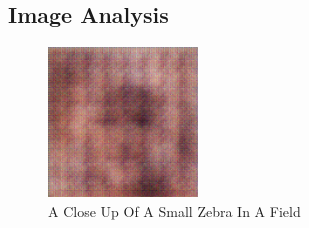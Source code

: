 \documentclass{article}%
\begin{document}
%
\subsection{Image Analysis}%
\label{subsec:ImageAnalysis}%


\begin{figure}[h!]%
\centering%
\includegraphics[width=150px]{500_fake_images/samples_5_197.png}%
\caption{A Close Up Of A Small Zebra In A Field}%
\end{figure}

%
\end{document}
